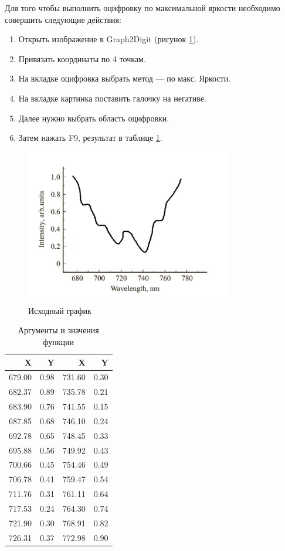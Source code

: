 \documentclass[a4paper,14pt,russian]{report}
\begin{document}
Для того чтобы выполнить оцифровку по максимальной яркости необходимо совершить следующие действия:

\begin{enumerate}
  \item Открыть изображение в Graph2Digit (рисунок \ref{graph:origin}).
  \item Привязать координаты по 4 точкам.
  \item На вкладке оцифровка выбрать метод — по макс. Яркости.
  \item На вкладке картинка поставить галочку на негативе.
  \item Далее нужно выбрать область оцифровки.
  \item Затем нажать F9, результат в таблице \ref{table:brightness}.
\end{enumerate}

\begin{figure}[!htb]
  \centerline{\includegraphics[width=0.8\textwidth]{graph-origin}}
  \caption{Исходный график}
  \label{graph:origin}
\end{figure}

\begin{table}[!htb]
\centering
\caption{Аргументы и значения функции}
\label{table:brightness}
\begin{tabular}{|r|r|r|r|}
  \hline
  X & Y & X & Y \\
  \hline
  679.00 & 0.98 & 731.60 & 0.30 \\
  682.37 & 0.89 & 735.78 & 0.21 \\
  683.90 & 0.76 & 741.55 & 0.15 \\
  687.85 & 0.68 & 746.10 & 0.24 \\
  692.78 & 0.65 & 748.45 & 0.33 \\
  695.88 & 0.56 & 749.92 & 0.43 \\
  700.66 & 0.45 & 754.46 & 0.49 \\
  706.78 & 0.41 & 759.47 & 0.54 \\
  711.76 & 0.31 & 761.11 & 0.64 \\
  717.53 & 0.24 & 764.30 & 0.74 \\
  721.90 & 0.30 & 768.91 & 0.82 \\
  726.31 & 0.37 & 772.98 & 0.90 \\
  \hline
\end{tabular}
\end{table}
\end{document}
